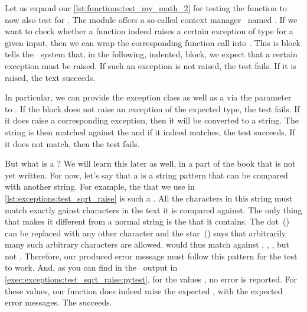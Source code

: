 Let us expand our \cref{lst:functions:test_my_math_2} for testing the  function to now also test for .
The  module offers a so-called context manager~\cite{PSF:P3D:TPSL:CUFWSC} named .
If we want to check whether a function indeed raises a certain exception of type  for a given input, then we can wrap the corresponding function call into .
This is block tells the \pytest\ system that, in the following, indented, block, we expect that a certain exception must be raised.
If such an exception is not raised, the test fails.
If it is raised, the text succeeds.

%
%
%
%
In particular, we can provide the exception class as well as a  via the parameter~ to .
If the block does not raise an exception of the expected type, the test fails.
If it does raise a corresponding exception, then it will be converted to a string.
The string is then matched against the  and if it indeed matches, the test succeeds.
If it does not match, then the test fails.%
%
\begin{sloppypar}%
But what is a ?
We will learn this later as well, in a part of the book that is not yet written.
For now, let's say that a  is a string pattern that can be compared with another string.
For example, the  that we use in \cref{lst:exceptions:test_sqrt_raise} is such a .
All the  characters in this string must match exactly gainst characters in the text it is compared against.
The only thing that makes it different from a normal string is the  that it contains.
The dot~() can be replaced with any other character and the star~(\textil{*}) says that arbitrarily many such arbitrary characters are allowed.
 would thus match against , , , but not .
Therefore, our produced error message must follow this pattern for the test to work.
And, as you can find in the \pytest\ output in \cref{exec:exceptions:test_sqrt_raise:pytest}, for the values , no error is reported.
For these values, our  function does indeed raise the expected , with the expected error messages.
The  succeeds.%
\end{sloppypar}%
